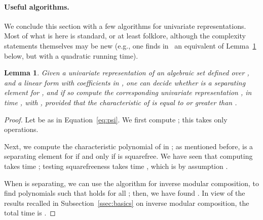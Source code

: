 \documentclass[12pt]{article}
\newtheorem{Lemma}{Lemma}
\begin{document}
\paragraph{Useful algorithms.} We conclude this section with a few
algorithms for univariate representations. Most of what is here is
standard, or at least folklore, although the complexity statements
themselves may be new (e.g., one finds in~\cite{GiLeSa01} an
equivalent of Lemma~\ref{lemma:change} below, but with a quadratic
running time).

\begin{Lemma}\label{lemma:change}
  Given a univariate representation  of an algebraic
  set  defined over , and a linear form
   with coefficients in , one
  can decide whether  is a separating element for , and if so
  compute the corresponding univariate representation
  , in time , with
  , provided that the characteristic of  is equal
  to  or greater than .
\end{Lemma}
\begin{proof}
  Let  be as in Equation~\eqref{eq:psi}. We first compute
  ; this takes only
   operations.

  Next, we compute the characteristic polynomial  of  in
  ; as mentioned before,  is a separating
  element for  if and only if  is squarefree. We have seen that
  computing  takes time ; testing squarefreeness
  takes time , which is by assumption
  .

  When  is separating, we can use the algorithm for inverse
  modular composition, to find polynomials  such that
   holds for all ; then, we have found
  . In view of the results recalled in
  Subsection~\ref{ssec:basics} on inverse modular composition, the
  total time is .
\end{proof}
\end{document}
